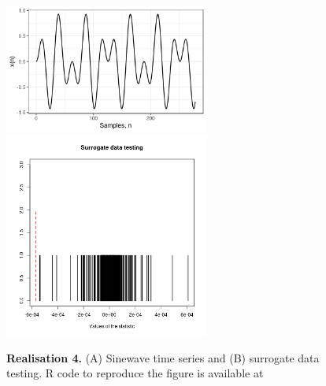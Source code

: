 \documentclass[11pt]{article}
\newcommand{\R}{\textsf{R}\xspace}
\newcommand{\codeicon}{{\color{linkcolor}\faFileCodeO}}
\newcommand{\codelink}[1]{\href{#1}{\codeicon}}
\begin{document}
\begin{figure}
\centering
\includegraphics[width=0.6\textwidth]{r4_ts_sinewaves_window_length_278} %
\includegraphics[width=0.6\textwidth]{r4_sdt_sinewaves_window_length_278} %
    \caption[]{
	{\bf Realisation 4.}
	(A) Sinewave time series and (B) surrogate data testing.
	\R code to reproduce the figure is available at 
	\codelink{https://github.com/mxochicale-phd/thesis/blob/master/0_code_data/1_code/x_surrogate/00_timeseries/code/B_.R}
}
    \label{fig:thesis-outline}
\end{figure}
\end{document}

